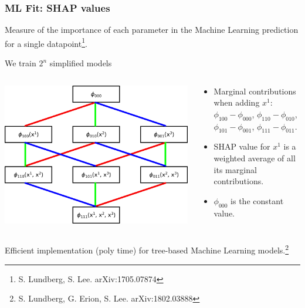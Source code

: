 \documentclass[mathserif, 10pt]{beamer}
\begin{document}
\begin{frame}\frametitle{ML Fit: SHAP values}

    Measure of the importance of each parameter in the Machine Learning prediction for a single datapoint\footnote[15]{S. Lundberg, S. Lee. arXiv:1705.07874}.

    We train $2^n$ simplified models

    \begin{columns}
        \begin{column}{0.5\textwidth}
            \includegraphics[width=\columnwidth]{figures/shapgraph.png}
        \end{column}
        \begin{column}{0.5\textwidth}
            \begin{itemize}
                \item Marginal contributions {\color{red} when adding $x^1$}: $\phi_{100}-\phi_{000}$, $\phi_{110}-\phi_{010}$, $\phi_{101}-\phi_{001}$, $\phi_{111} - \phi_{011}$.
                \item SHAP value {\color{red}for $x^1$} is a weighted average of all its marginal contributions.
                \item $\phi_{000}$ is the constant value.
            \end{itemize}
        \end{column}
    \end{columns}

    Efficient implementation (poly time) for tree-based Machine Learning models.\footnote[16]{S. Lundberg, G. Erion, S. Lee. arXiv:1802.03888}

\end{frame}
\end{document}
